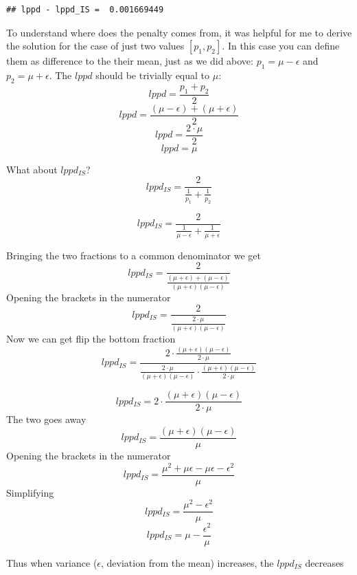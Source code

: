 \documentclass[
]{book}
\begin{document}
\begin{verbatim}
## lppd - lppd_IS =  0.001669449
\end{verbatim}

To understand where does the penalty comes from, it was helpful for me to derive the solution for the case of just two values \([p_1, p_2]\). In this case you can define them as difference to the their mean, just as we did above: \(p_1 = \mu - \epsilon\) and \(p_2 = \mu + \epsilon\). The \(lppd\) should be trivially equal to \(\mu\):
\[lppd = \frac{p_1 + p_2}{2}\]
\[lppd =\frac{(\mu - \epsilon) + (\mu + \epsilon)}{2}\]
\[lppd =\frac{2 \cdot \mu}{2}\]
\[lppd = \mu\]

What about \(lppd_{IS}\)?
\[lppd_{IS} = \frac{2}{\frac{1}{p_1} + \frac{1}{p_2}}\]

\[lppd_{IS} = \frac{2}{\frac{1}{\mu - \epsilon} + \frac{1}{\mu + \epsilon}}\]

Bringing the two fractions to a common denominator we get
\[lppd_{IS} = \frac{2}{\frac{(\mu + \epsilon) + (\mu - \epsilon)}{(\mu + \epsilon)(\mu - \epsilon)}}\]
Opening the brackets in the numerator
\[lppd_{IS} = \frac{2}{\frac{2 \cdot \mu }{(\mu + \epsilon)(\mu - \epsilon)}}\]
Now we can get flip the bottom fraction
\[lppd_{IS} = \frac{2 \cdot \frac{(\mu + \epsilon)(\mu - \epsilon)}{2 \cdot \mu}}{\frac{2 \cdot \mu }{(\mu + \epsilon)(\mu - \epsilon)} \cdot \frac{(\mu + \epsilon)(\mu - \epsilon)}{2 \cdot \mu}} \]

\[lppd_{IS} = 2 \cdot \frac{(\mu + \epsilon)(\mu - \epsilon)}{2 \cdot \mu}\]
The two goes away
\[lppd_{IS} = \frac{(\mu + \epsilon)(\mu - \epsilon)}{\mu}\]
Opening the brackets in the numerator
\[lppd_{IS} = \frac{\mu^2 + \mu\epsilon - \mu\epsilon - \epsilon^2}{\mu}\]
Simplifying
\[lppd_{IS} = \frac{\mu^2 - \epsilon^2}{\mu}\]
\[lppd_{IS} = \mu - \frac{\epsilon^2}{\mu}\]

Thus when variance (\(\epsilon\), deviation from the mean) increases, the \(lppd_{IS}\) decreases
\end{document}
